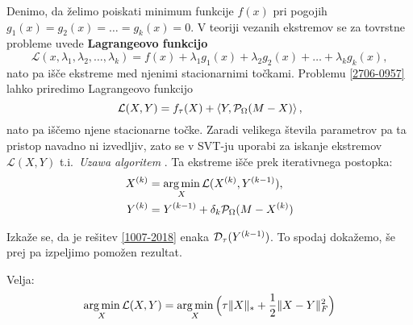 Denimo, da želimo poiskati minimum funkcije $f(x)$ pri pogojih $g_1(x)=g_2(x)=\ldots=g_{k}(x)=0$.
V teoriji vezanih ekstremov se za tovrstne probleme uvede \textbf{Lagrangeovo funkcijo}
\[\mathcal{L}(x, \lambda_1,\lambda_2,\ldots,\lambda_k) = f(x) + \lambda_1 g_1(x)+\lambda_2g_2(x)+\ldots+\lambda_kg_k(x),\]
nato pa išče ekstreme med njenimi stacionarnimi točkami.
Problemu \eqref{2706-0957} lahko priredimo Lagrangeovo funkcijo
\[
    \mathcal{L}(X, Y) = f_\tau(X) + \left< Y, \mathcal{P}_\Omega(M - X) \right>,
\] 
nato pa iščemo njene stacionarne točke.
Zaradi velikega števila parametrov pa ta pristop navadno ni izvedljiv, zato se v SVT-ju uporabi za iskanje ekstremov $\mathcal{L}(X, Y)$ t.i.\ \textit{Uzawa algoritem} \cite{CCS}. Ta ekstreme išče prek iterativnega postopka:
\begin{align}
        X^{(k)} &=  \operatorname*{arg\,min}_{X} \mathcal{L}(X^{(k)}, Y^{(k-1)}) \label{1007-2018},\\
        Y^{(k)} &= Y^{(k-1)} + \delta_k \mathcal{P}_\Omega(M - X^{(k)}) \label{1007-2019}
\end{align}

Izkaže se, da je rešitev \eqref{1007-2018} enaka $\mathcal{D}_\tau(Y^{(k-1)})$. To spodaj dokažemo, še prej pa izpeljimo pomožen rezultat.

\begin{trditev}
Velja:
\begin{align}
    \operatorname*{arg\,min}_X  \mathcal{L}(X, Y)
    = \operatorname*{arg\,min}_X \Big(\tau\lVert X\rVert_* + \frac{1}{2}\lVert X - Y\rVert_F^2\Big)
\end{align}
\end{trditev}

